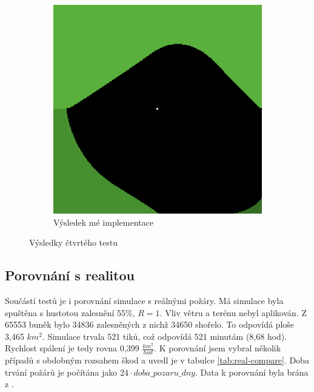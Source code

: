 \documentclass[11pt,a4paper]{scrartcl}
\begin{document}
\begin{figure}[H]
\begin{subfigure} {0.3 \textwidth}
			\includegraphics[width=\linewidth]{inhomogeneous-wh}
			\caption{Výsledek mé implementace}
			\label{fig:test-4-res-mine}
		\end{subfigure}
		
		\caption{Výsledky čtvrtého testu}
		\label{fig:test-4-res}
	\end{figure}
	
	\subsection{Porovnání s realitou}
	Součástí testů je i porovnání simulace s reálnými požáry. Má simulace byla spuštěna s hustotou zalesnění 55\%, $R=1$. Vliv větru a terénu nebyl aplikován. Z 65553 buněk bylo 34836 zalesněných z nichž 34650 shořelo. To odpovídá ploše 3,465 $km^2$. Simulace trvala 521 tiků, což odpovídá 521 minutám (8,68 hod). Rychlost spálení je tedy rovna 0,399 $\frac{km^2}{hod}$. K porovnání jsem vybral několik případů s obdobným rozsahem škod a uvedl je v tabulce \ref{tab:real-compare}. Doba trvání požárů je počítána jako $24\cdot doba\_pozaru\_dny$. Data k porovnání byla  brána z \cite{wiki-fires}.
	
\end{document}

